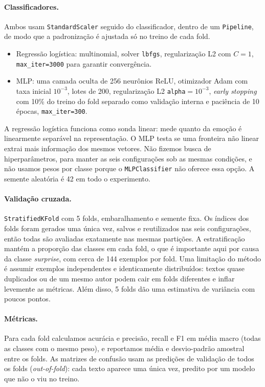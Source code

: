 \documentclass[11pt,a4paper]{article}
\begin{document}
\paragraph{Classificadores.} Ambos usam \texttt{StandardScaler} seguido do classificador, dentro de um \texttt{Pipeline}, de modo que a padronização é ajustada só no treino de cada fold.
\begin{itemize}
\item Regressão logística: multinomial, solver \texttt{lbfgs}, regularização L2 com $C=1$, \texttt{max\_iter=3000} para garantir convergência.
\item MLP: uma camada oculta de 256 neurônios ReLU, otimizador Adam com taxa inicial $10^{-3}$, lotes de 200, regularização L2 \texttt{alpha}$=10^{-3}$, \textit{early stopping} com 10\% do treino do fold separado como validação interna e paciência de 10 épocas, \texttt{max\_iter=300}.
\end{itemize}
A regressão logística funciona como sonda linear: mede quanto da emoção é linearmente separável na representação. O MLP testa se uma fronteira não linear extrai mais informação dos mesmos vetores. Não fizemos busca de hiperparâmetros, para manter as seis configurações sob as mesmas condições, e não usamos pesos por classe porque o \texttt{MLPClassifier} não oferece essa opção. A semente aleatória é 42 em todo o experimento.

\paragraph{Validação cruzada.} \texttt{StratifiedKFold} com 5 folds, embaralhamento e semente fixa. Os índices dos folds foram gerados uma única vez, salvos e reutilizados nas seis configurações, então todas são avaliadas exatamente nas mesmas partições. A estratificação mantém a proporção das classes em cada fold, o que é importante aqui por causa da classe \textit{surprise}, com cerca de 144 exemplos por fold. Uma limitação do método é assumir exemplos independentes e identicamente distribuídos: textos quase duplicados ou de um mesmo autor podem cair em folds diferentes e inflar levemente as métricas. Além disso, 5 folds dão uma estimativa de variância com poucos pontos.

\paragraph{Métricas.} Para cada fold calculamos acurácia e precisão, recall e F1 em média macro (todas as classes com o mesmo peso), e reportamos média e desvio-padrão amostral entre os folds. As matrizes de confusão usam as predições de validação de todos os folds (\textit{out-of-fold}): cada texto aparece uma única vez, predito por um modelo que não o viu no treino.
\end{document}
